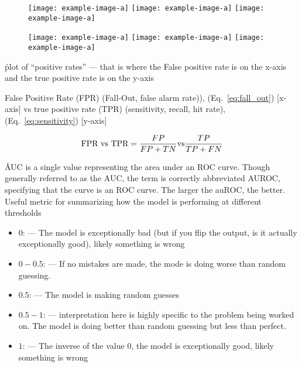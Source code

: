
\begin{figure}[htp]
	\centering
	\texttt{[image: example-image-a]}\hfil
	\texttt{[image: example-image-a]}\hfil
	\texttt{[image: example-image-a]}\hfil
	\caption{}
	\label{fig:auc_dist}
\end{figure}

\begin{figure}[htp]
	\centering
	\texttt{[image: example-image-a]}\hfil
	\texttt{[image: example-image-a]}\hfil
	\texttt{[image: example-image-a]}\hfil
	\caption{}
	\label{fig:auroc_curves}
\end{figure}


\r{plot of ``positive rates'' --- that is where the False positive rate is on the x-axis and the true positive rate is on the y-axis}

False Positive Rate (FPR) (Fall-Out, false alarm rate)), (Eq.~\ref{eq:fall_out}) [x-axis] vs true positive rate (TPR) (sensitivity, recall, hit rate), (Eq.~\ref{eq:sensitivity}) [y-axis]

\begin{equation}
\textmd{FPR} \textmd{ vs } \textmd{TPR} =	{\frac{FP}{FP+TN}} \textmd{vs} {\frac{TP}{TP+FN}} 
	\label{eq:roc}
\end{equation}

\r{AUC is a single value representing the area under an ROC curve. Though generally referred to as the AUC, the term is correctly abbreviated AUROC, specifying that the curve is an ROC curve. The larger the auROC, the better. Useful metric for summarizing how the model is performing at different thresholds}


\begin{itemize}[noitemsep,topsep=0pt]
	\item $0$: --- The model is exceptionally bad (but if you flip the output, is it actually exceptionally good), likely something is wrong
	\item $0 - 0.5$: --- If no mistakes are made, the mode is doing worse than random guessing.
	\item $0.5$: --- The model is making random guesses
	\item $0.5 - 1$: --- interpretation here is highly specific to the problem being worked on. The model is doing better than random guessing but less than perfect.
	\item $1$: --- The inverse of the value $0$, the model is exceptionally good, likely something is wrong
\end{itemize}

